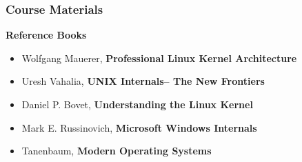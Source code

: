 \begin{frame}[plain]	
	\frametitle{Course Materials}
	\Large 
	\textbf{Reference Books}
	\begin{itemize}\large 
		\item Wolfgang Mauerer, \textbf{Professional Linux Kernel Architecture}
		\item Uresh Vahalia, \textbf{UNIX Internals-- The New Frontiers}
		\item Daniel P. Bovet, \textbf{Understanding the Linux Kernel}
		\item Mark E. Russinovich,\textbf{ Microsoft Windows Internals}
		\item Tanenbaum, \textbf{Modern Operating Systems}

	\end{itemize}
	
\end{frame}



